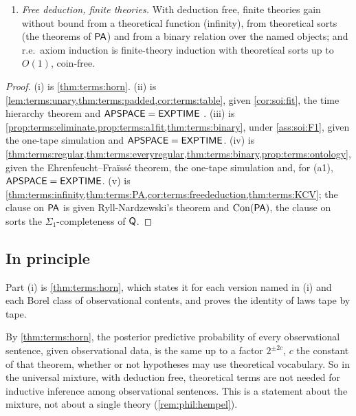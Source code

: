 \begin{theorem}
\begin{enumerate}[label=(\roman*),leftmargin=*]
\item \emph{Free deduction, finite theories.} With deduction free, finite theories gain without bound from a theoretical function (infinity), from theoretical sorts (the theorems of $\mathsf{PA}$) and from a binary relation over the named objects; and r.e.\ axiom induction is finite-theory induction with theoretical sorts up to $O(1)$, coin-free.
\end{enumerate}
\end{theorem}

\begin{proof}
(i) is \cref{thm:terms:horn}. (ii) is \cref{lem:terms:unary,thm:terms:padded,cor:terms:table}, given \cref{cor:soi:fit}, the time hierarchy theorem and $\mathsf{APSPACE}=\mathsf{EXPTIME}$ \citep{chandra1981alternation}. (iii) is \cref{prop:terms:eliminate,prop:terms:a1fit,thm:terms:binary}, under \cref{ass:soi:F1}, given the one-tape simulation and $\mathsf{APSPACE}=\mathsf{EXPTIME}$. (iv) is \cref{thm:terms:regular,thm:terms:everyregular,thm:terms:binary,prop:terms:ontology}, given the Ehrenfeucht--Fraïssé theorem, the one-tape simulation and, for (a1), $\mathsf{APSPACE}=\mathsf{EXPTIME}$. (v) is \cref{thm:terms:infinity,thm:terms:PA,cor:terms:freededuction,thm:terms:KCV}; the clause on $\mathsf{PA}$ is given Ryll-Nardzewski's theorem and $\mathrm{Con}(\mathsf{PA})$, the clause on sorts the $\Sigma_1$-completeness of $\mathsf{Q}$.
\end{proof}

\subsection{In principle}\label{sec:terms:horn}

Part (i) is \cref{thm:terms:horn}, which states it for each version named in (i) and each Borel class of observational contents, and proves the identity of laws tape by tape.

\begin{remark}\label{rem:terms:hempel}
By \cref{thm:terms:horn}, the posterior predictive probability of every observational sentence, given observational data, is the same up to a factor $2^{\pm2c}$, $c$ the constant of that theorem, whether or not hypotheses may use theoretical vocabulary. So in the universal mixture, with deduction free, theoretical terms are not needed for inductive inference among observational sentences. This is a statement about the mixture, not about a single theory (\cref{rem:phil:hempel}).
\end{remark}

